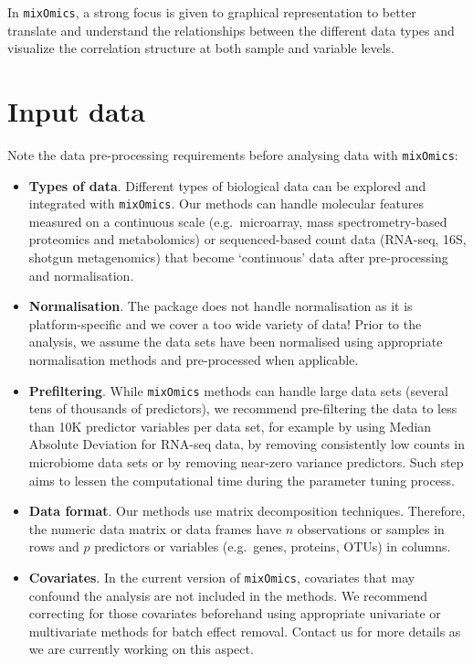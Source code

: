 \documentclass[
]{book}
\begin{document}
In \texttt{mixOmics}, a strong focus is given to graphical representation to better translate and understand the relationships between the different data types and visualize the correlation structure at both sample and variable levels.

\hypertarget{01:datatypes}{%
\section{Input data}\label{01:datatypes}}

Note the data pre-processing requirements before analysing data with \texttt{mixOmics}:

\begin{itemize}
\item
  \textbf{Types of data}. Different types of biological data can be explored and integrated with \texttt{mixOmics}. Our methods can handle molecular features measured on a continuous scale (e.g.~microarray, mass spectrometry-based proteomics and metabolomics) or sequenced-based count data (RNA-seq, 16S, shotgun metagenomics) that become `continuous' data after pre-processing and normalisation.
\item
  \textbf{Normalisation}. The package does not handle normalisation as it is platform-specific and we cover a too wide variety of data! Prior to the analysis, we assume the data sets have been normalised using appropriate normalisation methods and pre-processed when applicable.
\item
  \textbf{Prefiltering}. While \texttt{mixOmics} methods can handle large data sets (several tens of thousands of predictors), we recommend pre-filtering the data to less than 10K predictor variables per data set, for example by using Median Absolute Deviation \citep{Ten16} for RNA-seq data, by removing consistently low counts in microbiome data sets \citep{Lec16} or by removing near-zero variance predictors. Such step aims to lessen the computational time during the parameter tuning process.
\item
  \textbf{Data format}.
  Our methods use matrix decomposition techniques. Therefore, the numeric data matrix or data frames have \(n\) observations or samples in rows and \(p\) predictors or variables (e.g.~genes, proteins, OTUs) in columns.
\item
  \textbf{Covariates}. In the current version of \texttt{mixOmics}, covariates that may confound the analysis are not included in the methods. We recommend correcting for those covariates beforehand using appropriate univariate or multivariate methods for batch effect removal. Contact us for more details as we are currently working on this aspect.
\end{itemize}
\end{document}
